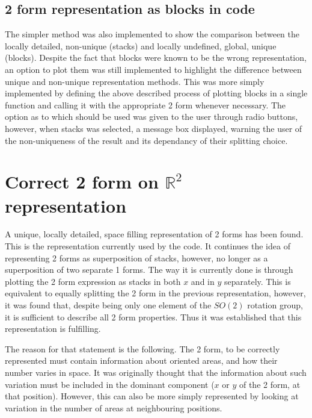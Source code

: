 \documentclass[11]{report}
\begin{document}
\subsection{2 form representation as blocks in code}
The simpler method was also implemented to show the comparison between the  locally detailed, non-unique (stacks) and locally undefined, global, unique (blocks). Despite the fact that blocks were known to be the wrong representation, an option to plot them was still implemented to highlight the difference between unique and non-unique representation methods. 
This was more simply implemented by defining the above described process of plotting blocks in a single function and calling it with the appropriate 2 form whenever necessary.
The option as to which should be used was given to the user through radio buttons, however, when stacks was selected, a message box displayed, warning the user of the non-uniqueness of the result and its dependancy of their splitting choice.

\section{Correct 2 form on $\mathbb{R}^{2}$ representation}
A unique, locally detailed, space filling representation of 2 forms has been found. This is the representation currently used by the code. It continues the idea of representing 2 forms as superposition of stacks, however, no longer as a superposition of two separate 1 forms. The way it is currently done is through plotting the 2 form expression as stacks in both $x$ and in $y$ separately. This is equivalent to equally splitting the 2 form in the previous representation, however, it was found that, despite being only one element of the $SO(2)$ rotation group, it is sufficient to describe all 2 form properties. Thus it was established that this representation is fulfilling.

The reason for that statement is the following. The 2 form, to be correctly represented must contain information about oriented areas, and how their number varies in space. It was originally thought that the information about such variation must be included in the dominant component ($x$ or $y$ of the 2 form, at that position). However, this can also be more simply represented by looking at variation in the number of areas at neighbouring positions.
\end{document}
